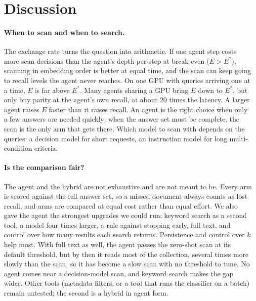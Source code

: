 \documentclass[11pt]{article}
\begin{document}
\section{Discussion}

\paragraph{When to scan and when to search.}
The exchange rate turns the question into arithmetic. If one agent step costs
more scan decisions than the agent's depth-per-step at break-even
($E > E^\ast$), scanning in embedding order is better at equal time, and the
scan can keep going to recall levels the agent never reaches. On one GPU with
queries arriving one at a time, $E$ is far above $E^\ast$. Many agents sharing
a GPU bring $E$ down to $E^\ast$, but only buy parity at the agent's own recall,
at about 20 times the latency. A larger agent raises $E$ faster than it raises
recall. An agent is the right choice when only a few answers are needed
quickly; when the answer set must be complete, the scan is the only arm that
gets there. Which model to scan with depends on the queries: a decision model
for short requests, an instruction model for long multi-condition criteria.

\paragraph{Is the comparison fair?}
The agent and the hybrid are not exhaustive and are not meant to be. Every arm
is scored against the full answer set, so a missed document always counts as
lost recall, and arms are compared at equal cost rather than equal effort.
We also gave the agent the strongest upgrades we could run: keyword search as a
second tool, a model four times larger, a rule against stopping early, full
text, and control over how many results each search returns. Persistence and
control over $k$ help most. With full text as well, the agent passes the
zero-shot scan at its default threshold, but by then it reads most of the
collection, several times more slowly than the scan, so it has become a slow
scan with no threshold to tune. No agent comes near a decision-model scan, and
keyword search makes the gap wider. Other tools (metadata filters, or a tool that runs the
classifier on a batch) remain untested; the second is a hybrid in agent form.
\end{document}
